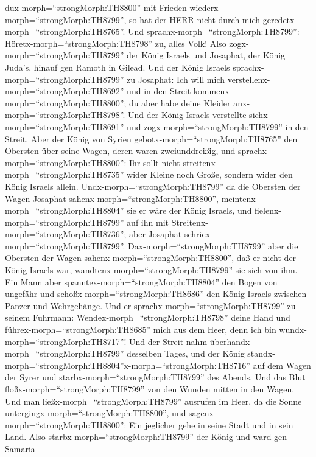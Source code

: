 dux-morph=``strongMorph:TH8800'' mit Frieden
wiederx-morph=``strongMorph:TH8799'', so hat der HERR nicht durch mich
geredetx-morph=``strongMorph:TH8765''. Und
sprachx-morph=``strongMorph:TH8799'':
Höretx-morph=``strongMorph:TH8798'' zu, alles Volk!  Also
zogx-morph=``strongMorph:TH8799'' der König Israels und Josaphat, der
König Juda's, hinauf gen Ramoth in Gilead.  Und der König
Israels sprachx-morph=``strongMorph:TH8799'' zu Josaphat: Ich will mich
verstellenx-morph=``strongMorph:TH8692'' und in den Streit
kommenx-morph=``strongMorph:TH8800''; du aber habe deine Kleider
anx-morph=``strongMorph:TH8798''. Und der König Israels verstellte
sichx-morph=``strongMorph:TH8691'' und zogx-morph=``strongMorph:TH8799''
in den Streit.  Aber der König von Syrien
gebotx-morph=``strongMorph:TH8765'' den Obersten über seine Wagen, deren
waren zweiunddreißig, und sprachx-morph=``strongMorph:TH8800'': Ihr
sollt nicht streitenx-morph=``strongMorph:TH8735'' wider Kleine noch
Große, sondern wider den König Israels allein. 
Undx-morph=``strongMorph:TH8799'' da die Obersten der Wagen Josaphat
sahenx-morph=``strongMorph:TH8800'',
meintenx-morph=``strongMorph:TH8804'' sie er wäre der König Israels, und
fielenx-morph=``strongMorph:TH8799'' auf ihn mit
Streitenx-morph=``strongMorph:TH8736''; aber Josaphat
schriex-morph=``strongMorph:TH8799''. 
Dax-morph=``strongMorph:TH8799'' aber die Obersten der Wagen
sahenx-morph=``strongMorph:TH8800'', daß er nicht der König Israels war,
wandtenx-morph=``strongMorph:TH8799'' sie sich von ihm. 
Ein Mann aber spanntex-morph=``strongMorph:TH8804'' den Bogen von
ungefähr und schoßx-morph=``strongMorph:TH8686'' den König Israels
zwischen Panzer und Wehrgehänge. Und er
sprachx-morph=``strongMorph:TH8799'' zu seinem Fuhrmann:
Wendex-morph=``strongMorph:TH8798'' deine Hand und
führex-morph=``strongMorph:TH8685'' mich aus dem Heer, denn ich bin
wundx-morph=``strongMorph:TH8717''!  Und der Streit nahm
überhandx-morph=``strongMorph:TH8799'' desselben Tages, und der König
standx-morph=``strongMorph:TH8804''x-morph=``strongMorph:TH8716'' auf
dem Wagen der Syrer und starbx-morph=``strongMorph:TH8799'' des Abends.
Und das Blut floßx-morph=``strongMorph:TH8799'' von den Wunden mitten in
den Wagen.  Und man ließx-morph=``strongMorph:TH8799''
ausrufen im Heer, da die Sonne untergingx-morph=``strongMorph:TH8800'',
und sagenx-morph=``strongMorph:TH8800'': Ein jeglicher gehe in seine
Stadt und in sein Land.  Also
starbx-morph=``strongMorph:TH8799'' der König und ward gen Samaria
